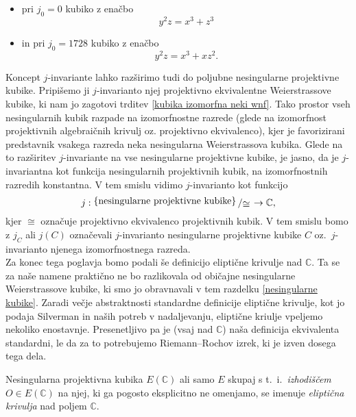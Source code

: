 \documentclass[mat1]{fmfdelo}
\numberwithin{equation}{section}
\newcommand{\C}{\mathbb C}
\newcommand{\bigslant}[2]{{\raisebox{.2em}{$#1$}\left/\raisebox{-.2em}{$#2$}\right.}}
\theoremstyle{definition}
\begin{document}
\begin{itemize}
    \item pri $j_0 = 0$ kubiko z enačbo 
    \[
        y^2z = x^3 + z^3
    \]
    \item in pri $j_0 = 1728$ kubiko z enačbo
    \[
        y^2z = x^3 + xz^2.
    \]
\end{itemize}

Koncept $j$-invariante lahko razširimo tudi do poljubne nesingularne projektivne kubike. Pripišemo ji $j$-invarianto njej projektivno ekvivalentne Weierstrassove kubike, ki nam jo zagotovi trditev \ref{kubika izomorfna neki wnf}. Tako prostor vseh nesingularnih kubik razpade na izomorfnostne razrede (glede na izomorfnost projektivnih algebraičnih krivulj oz. projektivno ekvivalenco), kjer je favorizirani predstavnik vsakega razreda neka nesingularna Weierstrassova kubika. Glede na to razširitev $j$-invariante na vse nesingularne projektivne kubike, je jasno, da je $j$-invariantna kot funkcija nesingularnih projektivnih kubik, na izomorfnostnih razredih konstantna. V tem smislu vidimo $j$-invarianto kot funkcijo
\[
    j: \bigslant{\{\text{nesingularne projektivne kubike}\}}{\cong} \to \C,
\]
kjer $\cong$ označuje projektivno ekvivalenco projektivnih kubik. V tem smislu bomo z $j_C$ ali $j(C)$ označevali $j$-invarianto nesingularne projektivne kubike $C$ oz.\ $j$-invarianto njenega izomorfnostnega razreda.
\\

Za konec tega poglavja bomo podali še definicijo eliptične krivulje nad $\C$. Ta se za naše namene praktično ne bo razlikovala od običajne nesingularne Weierstrassove kubike, ki smo jo obravnavali v tem razdelku \ref{nesingularne kubike}. Zaradi večje abstraktnosti standardne definicije eliptične krivulje, kot jo podaja Silverman \cite[III. \S 3.]{Silverman} in naših potreb v nadaljevanju, eliptične kriulje vpeljemo nekoliko enostavnje. Presenetljivo pa je (vsaj nad $\C$) naša definicija ekvivalenta standardni, le da za to potrebujemo Riemann--Rochov izrek, ki je izven dosega tega dela.

\begin{definicija}
    Nesingularna projektivna kubika $E(\C)$ ali samo $E$ skupaj s t.~i.\ \emph{izhodiščem} $O \in E(\C)$ na njej, ki ga pogosto eksplicitno ne omenjamo, se imenuje \emph{eliptična krivulja} nad poljem $\C$. 
\end{definicija}
\end{document}
